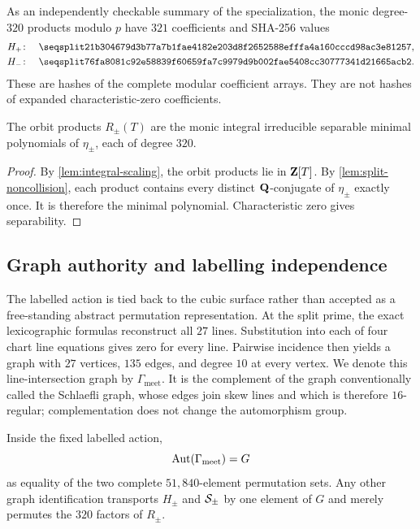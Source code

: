 As an independently checkable summary of the specialization, the monic
degree-$320$ products modulo $p$ have $321$ coefficients and SHA-256 values
\begin{align}
 H_+\colon\quad &
 \hexsha{21b304679d3b77a7b1fae4182e203d8f2652588efffa4a160cccd98ac3e81257},
 \label{eq:modhash-plus}\\
 H_-\colon\quad &
 \hexsha{76fa8081c92e58839f60659fa7c9979d9b002fae5408cc30777341d21665acb2}.
 \label{eq:modhash-minus}
\end{align}
These are hashes of the complete modular coefficient arrays.  They are not
hashes of expanded characteristic-zero coefficients.

\begin{corollary}
\label{cor:product-minimal}
The orbit products $R_\pm(T)$ are the monic integral irreducible separable
minimal polynomials of $\eta_\pm$, each of degree $320$.
\end{corollary}

\begin{proof}
By \cref{lem:integral-scaling}, the orbit products lie in $\mathbf{Z}[T]$.  By
\cref{lem:split-noncollision}, each product contains every distinct
$\mathbf{Q}$-conjugate of $\eta_\pm$ exactly once.  It is therefore the minimal
polynomial.  Characteristic zero gives separability.
\end{proof}

\subsection{Graph authority and labelling independence}

The labelled action is tied back to the cubic surface rather than accepted
as a free-standing abstract permutation representation.  At the split prime,
the exact lexicographic formulas reconstruct all $27$ lines.  Substitution
into each of four chart line equations gives zero for every line.  Pairwise
incidence then yields a graph with $27$ vertices, $135$ edges, and degree
$10$ at every vertex.  We denote this line-intersection graph by
$\Gamma_{\mathrm{meet}}$.  It is the complement of the graph conventionally
called the Schlaefli graph, whose edges join skew lines and which is therefore
$16$-regular; complementation does not change the automorphism group.

\begin{lemma}
\label{lem:graph-bridge}
Inside the fixed labelled action,
\[
 \operatorname{Aut}(\Gamma_{\mathrm{meet}})=G
\]
as equality of the two complete $51{,}840$-element permutation sets.  Any
other graph identification transports $H_\pm$ and $\mathcal{S}_\pm$ by one element
of $G$ and merely permutes the $320$ factors of $R_\pm$.
\end{lemma}

